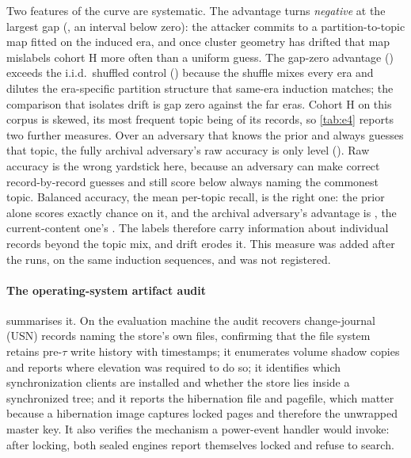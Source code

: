 \documentclass[10pt,journal,compsoc]{IEEEtran}
\begin{document}


Two features of the curve are systematic. The advantage turns \emph{negative} at the largest gap
(\REfourNaive, an interval below zero): the attacker commits to a partition-to-topic map fitted on
the induced era, and once cluster geometry has drifted that map mislabels cohort H more often than
a uniform guess. The gap-zero advantage (\REfourAware) exceeds the i.i.d.\ shuffled control
(\REfourShuffled) because the shuffle mixes every era and dilutes the era-specific partition
structure that same-era induction matches; the comparison that isolates drift is gap zero against
the far eras. Cohort H on this corpus is skewed, its most frequent topic being \REfourMajority{} of
its records, so \cref{tab:e4} reports two further measures. Over an adversary that knows the prior
and always guesses that topic, the fully archival adversary's raw accuracy is only level
(\REfourAwareMajority). Raw accuracy is the wrong yardstick here, because an adversary can make
correct record-by-record guesses and still score below always naming the commonest topic.
Balanced accuracy, the mean per-topic recall, is the right one: the prior alone scores exactly
chance on it, and the archival adversary's advantage is \REfourAwareBal, the current-content one's
\REfourNaiveBal. The labels therefore carry information about individual records beyond the topic
mix, and drift erodes it. This measure was added after the runs, on the same induction sequences,
and was not registered.










\paragraph{The operating-system artifact audit}  summarises it. On the
evaluation machine the audit recovers change-journal (USN) records naming the store's own files,
confirming that the file system retains pre-$\tau$ write history with timestamps; it enumerates
volume shadow copies and reports where elevation was required to do so; it identifies which
synchronization clients are installed and whether the store lies inside a synchronized tree; and it
reports the hibernation file and pagefile, which matter because a hibernation image captures locked
pages and therefore the unwrapped master key. It also verifies the mechanism a power-event handler
would invoke: after locking, both sealed engines report themselves locked and refuse to search.
\end{document}
